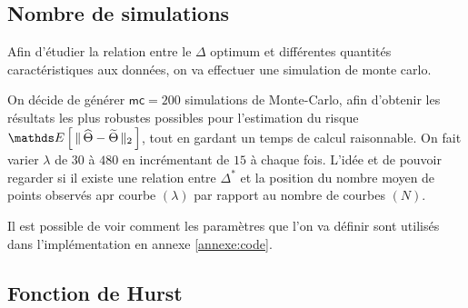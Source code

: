 
\subsection{Nombre de simulations}

Afin d'étudier la relation entre le $\Delta$ optimum et différentes quantités caractéristiques aux données, on va effectuer une simulation de monte carlo.

On décide de générer $\mathsf{mc} = 200$ simulations de Monte-Carlo, afin d'obtenir les résultats les plus robustes possibles pour l'estimation du risque $\esperance{\distnorme 2 {\widehat \Theta} {\widetilde \Theta}}$, tout en gardant un temps de calcul raisonnable. On fait varier $\lambda$ de $30$ à $480$ en incrémentant de $15$ à chaque fois. L'idée et de pouvoir regarder si il existe une relation entre $\Delta^*$ et la position du nombre moyen de points observés apr courbe $(\lambda)$ par rapport au nombre de courbes $(N)$.

\smallskip

Il est possible de voir comment les paramètres que l'on va définir sont utilisés dans l'implémentation en annexe \ref{annexe:code}.


\newcommand{\tlnm}{T^{[\lambda]}_{n}[m]}
\newcommand{\mset}{\llbracket 1, M_n \rrbracket}
\newcommand{\nset}{\llbracket 1, N \rrbracket}
\newcommand{\lbdset}{\llbracket 30, 45, \dots , 480 \rrbracket}
\newcommand{\genxset}{\bigl(\tlnm, X_n(\tlnm)\bigr)_{m \in \mset}}
\newcommand{\simset}{\left\{ \genxset \, : \, n \in \nset, \, \lambda \& N \textsf{ fixés } \right\}}
\newcommand{\simsetall}{\left\{ \genxset \, : \, N \in \overrightarrow N, \, \lambda \in \lbdset, \, n \in \nset \right\}}

\subsection{Fonction de Hurst}


